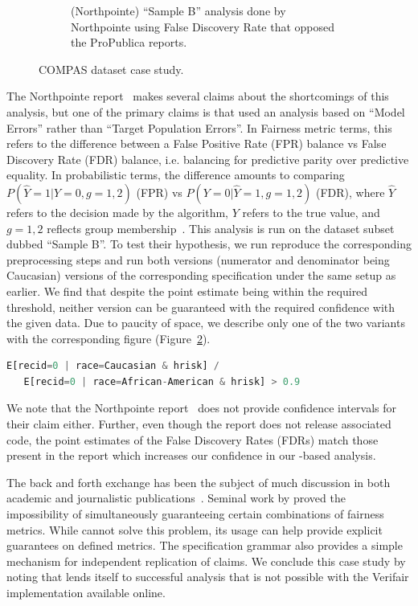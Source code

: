 \begin{figure}[ht!]
\begin{subfigure}{0.45\linewidth}
        \caption{(Northpointe) ``Sample B'' analysis done by Northpointe  using False Discovery Rate that opposed the ProPublica reports.}
        \label{fig:casestudy:compas:northpointe}
    \end{subfigure}
    \caption{COMPAS dataset case study.}
\end{figure}


The Northpointe report~\citep{dieterich2016compas} makes several claims about the shortcomings of this analysis, but one of the primary claims is that \citet{angwin2016machine} used an analysis based on ``Model Errors'' rather than ``Target Population Errors''.
In Fairness metric terms, this refers to the difference between a False Positive Rate (FPR) balance vs False Discovery Rate (FDR) balance, i.e. balancing for predictive parity over predictive equality. 
In probabilistic terms, the difference amounts to comparing $P(\hat{Y} = 1 | Y = 0, g=1, 2)$ (FPR) vs $P(Y = 0 | \hat{Y} = 1, g=1, 2)$ (FDR), where $\hat{Y}$ refers to the decision made by the algorithm, $Y$ refers to the true value, and $g = 1, 2$ reflects group membership~\citep{verma2018fairness}.
This analysis is run on the dataset subset dubbed ``Sample B''.
To test their hypothesis, we run reproduce the corresponding preprocessing steps and run both versions (numerator and denominator being Caucasian) versions of the corresponding specification under the same setup as earlier. 
We find that despite the point estimate being within the required threshold, neither version can be guaranteed with the required confidence with the given data.
Due to paucity of space, we describe only one of the two variants with the corresponding figure (Figure~\ref{fig:casestudy:compas:northpointe}).
\begin{lstlisting}[columns=flexible, language=Python]
   E[recid=0 | race=Caucasian & hrisk] /
   E[recid=0 | race=African-American & hrisk] > 0.9
\end{lstlisting}


We note that the Northpointe report~\citep{dieterich2016compas} does not provide confidence intervals for their claim either. 
Further, even though the report does not release associated code, the point estimates of the False Discovery Rates (FDRs) match those present in the report which increases our confidence in our \AVOIRmethodname{}-based analysis. 

The back and forth exchange has been the subject of much discussion in both academic and journalistic publications~\citep{feller2016computer, washington2018argue}.
Seminal work by \citet{kleinberg2017inherent} proved the impossibility of simultaneously guaranteeing certain combinations of fairness metrics.
While \AVOIRmethodname{} cannot solve this problem, its usage can help provide explicit guarantees on defined metrics.
The specification grammar also provides a simple mechanism for independent replication of claims. 
We conclude this case study by noting that \AVOIRmethodname{} lends itself to successful analysis that is not possible with the Verifair implementation available online. %

